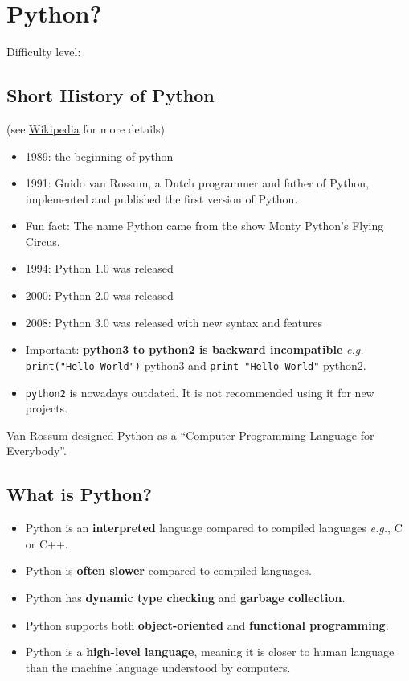 \documentclass[
  letterpaper,
  DIV=11,
  numbers=noendperiod]{scrreprt}
\providecommand{\tightlist}{%
  \setlength{\itemsep}{0pt}\setlength{\parskip}{0pt}}\usepackage{longtable,booktabs,array}
\begin{document}
\chapter{Python?}\label{python}

Difficulty level: { }

\section*{Short History of Python}\label{short-history-of-python}


(see \href{https://en.wikipedia.org/wiki/History_of_Python}{Wikipedia}
for more details)

\begin{itemize}
\tightlist
\item
  1989: the beginning of python
\item
  1991: Guido van Rossum, a Dutch programmer and father of Python,
  implemented and published the first version of Python.
\item
  Fun fact: The name Python came from the show Monty Python's Flying
  Circus.
\item
  1994: Python 1.0 was released
\item
  2000: Python 2.0 was released
\item
  2008: Python 3.0 was released with new syntax and features
\item
  Important: \textbf{python3 to python2 is backward incompatible}
  \emph{e.g.} \texttt{print("Hello\ World")} python3 and
  \texttt{print\ "Hello\ World"} python2.
\item
  \texttt{python2} is nowadays outdated. It is not recommended using it
  for new projects.
\end{itemize}

Van Rossum designed Python as a ``Computer Programming Language for
Everybody''.

\section*{What is Python?}\label{what-is-python}


\begin{itemize}
\item
  Python is an \textbf{interpreted} language compared to compiled
  languages \emph{e.g.}, C or C++.
\item
  Python is \textbf{often slower} compared to compiled languages.
\item
  Python has \textbf{dynamic type checking} and \textbf{garbage
  collection}.
\item
  Python supports both \textbf{object-oriented} and \textbf{functional
  programming}.
\item
  Python is a \textbf{high-level language}, meaning it is closer to
  human language than the machine language understood by computers.
\end{itemize}
\end{document}
